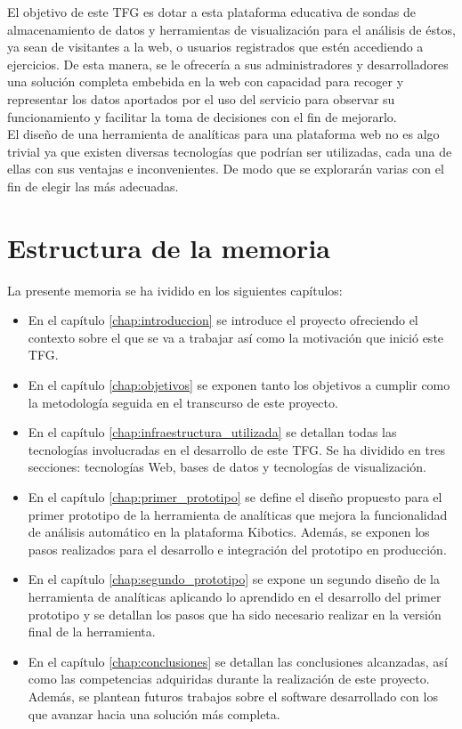 \documentclass[a4paper, 12pt]{book}
\begin{document}
		El objetivo de este TFG es dotar a esta plataforma educativa de sondas de almacenamiento de datos y herramientas de visualización para el análisis de éstos, ya sean de visitantes a la web, o usuarios registrados que estén accediendo a ejercicios. De esta manera, se le ofrecería a sus administradores y desarrolladores una solución completa embebida en la web con capacidad para recoger y representar los datos aportados por el uso del servicio para observar su funcionamiento y facilitar la toma de decisiones con el fin de mejorarlo. \\
			
		El diseño de una herramienta de analíticas para una plataforma web no es algo trivial ya que existen diversas tecnologías que podrían ser utilizadas, cada una de ellas con sus ventajas e inconvenientes. De modo que se explorarán varias con el fin de elegir las más adecuadas.
		
		
	\section{Estructura de la memoria}
	\label{sec:1_estructura_memoria}
	La presente memoria se ha ividido en los siguientes capítulos:
	
	\begin{itemize}
		\item En el capítulo \ref{chap:introduccion} se introduce el proyecto ofreciendo el contexto sobre el que se va a trabajar así como la motivación que inició este TFG.
		
		\item En el capítulo \ref{chap:objetivos} se exponen tanto los objetivos a cumplir como la metodología seguida en el transcurso de este proyecto. 
		
		\item En el capítulo \ref{chap:infraestructura_utilizada} se detallan todas las tecnologías involucradas en el desarrollo de este TFG. Se ha dividido en tres secciones: tecnologías Web, bases de datos y tecnologías de visualización. 
		
		\item En el capítulo \ref{chap:primer_prototipo} se define el diseño propuesto para el primer prototipo de la herramienta de analíticas que mejora la funcionalidad de análisis automático en la plataforma Kibotics. Además, se exponen los pasos realizados para el desarrollo e integración del prototipo en producción.
		
		\item En el capítulo \ref{chap:segundo_prototipo} se expone un segundo diseño de la herramienta de analíticas aplicando lo aprendido en el desarrollo del primer prototipo y se detallan los pasos que ha sido necesario realizar en la versión final de la herramienta.
		
		\item En el capítulo \ref{chap:conclusiones} se detallan las conclusiones alcanzadas, así como las competencias adquiridas durante la realización de este proyecto. Además, se plantean futuros trabajos sobre el software desarrollado con los que avanzar hacia una solución más completa.
		
	\end{itemize}
		
\end{document}
